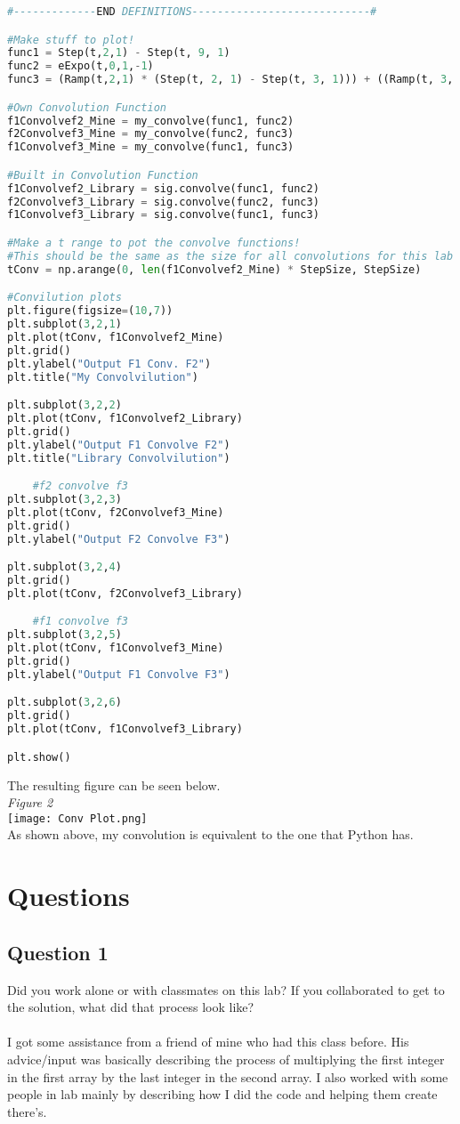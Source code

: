 \documentclass[12pt,a4paper]{article}
\begin{document}
\begin{lstlisting}[language=Python]
#-------------END DEFINITIONS----------------------------#

#Make stuff to plot!
func1 = Step(t,2,1) - Step(t, 9, 1)
func2 = eExpo(t,0,1,-1)
func3 = (Ramp(t,2,1) * (Step(t, 2, 1) - Step(t, 3, 1))) + ((Ramp(t, 3, -1) + 1) * (Step(t, 3, 1) - Step(t, 4, 1)) ) #x * y

#Own Convolution Function
f1Convolvef2_Mine = my_convolve(func1, func2)
f2Convolvef3_Mine = my_convolve(func2, func3)
f1Convolvef3_Mine = my_convolve(func1, func3)

#Built in Convolution Function
f1Convolvef2_Library = sig.convolve(func1, func2)
f2Convolvef3_Library = sig.convolve(func2, func3)
f1Convolvef3_Library = sig.convolve(func1, func3)

#Make a t range to pot the convolve functions!
#This should be the same as the size for all convolutions for this lab
tConv = np.arange(0, len(f1Convolvef2_Mine) * StepSize, StepSize)

#Convilution plots
plt.figure(figsize=(10,7))
plt.subplot(3,2,1)
plt.plot(tConv, f1Convolvef2_Mine)
plt.grid()
plt.ylabel("Output F1 Conv. F2")
plt.title("My Convolvilution")

plt.subplot(3,2,2)
plt.plot(tConv, f1Convolvef2_Library)
plt.grid()
plt.ylabel("Output F1 Convolve F2")
plt.title("Library Convolvilution")

    #f2 convolve f3
plt.subplot(3,2,3)
plt.plot(tConv, f2Convolvef3_Mine)
plt.grid()
plt.ylabel("Output F2 Convolve F3")

plt.subplot(3,2,4)
plt.grid()
plt.plot(tConv, f2Convolvef3_Library)

    #f1 convolve f3
plt.subplot(3,2,5)
plt.plot(tConv, f1Convolvef3_Mine)
plt.grid()
plt.ylabel("Output F1 Convolve F3")

plt.subplot(3,2,6)
plt.grid()
plt.plot(tConv, f1Convolvef3_Library)

plt.show()
\end{lstlisting}
\newpage
The resulting figure can be seen below.\\
\textit{Figure 2}\\
\texttt{[image: Conv Plot.png]}\\
As shown above, my convolution is equivalent to the one that Python has.\\
\section{Questions}
\subsection{Question 1}
Did you work alone or with classmates on this lab? If you collaborated to get to the solution,
what did that process look like?\\
\\
I got some assistance from a friend of mine who had this class before. His advice/input was basically describing the process of multiplying the first integer in the first array by the last integer in the second array. I also worked with some people in lab mainly by describing how I did the code and helping them create there's.\\
\end{document}
